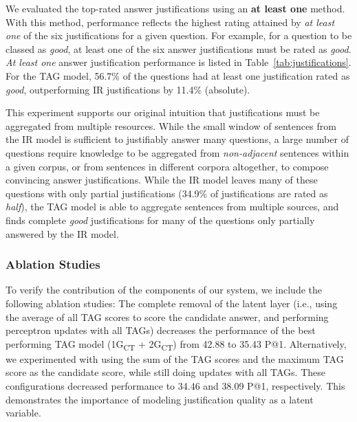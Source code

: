 {We evaluated the top-rated answer justifications using an {\bf at least one} method.  With this method, performance reflects the highest rating attained by \emph{at least one} of the six justifications for a given question. For example, for a question to be classed as {\em good}, at least one of the six answer justifications must be rated as {\em good}.  \emph{At least one} answer justification performance is listed in Table~\ref{tab:justifications}. For the TAG model, 56.7\% of the questions had at least one justification rated as {\em good}, outperforming IR justifications by 11.4\% (absolute).  


This experiment supports our original intuition that justifications must be aggregated from multiple resources. While the small window of sentences from the IR model is sufficient to justifiably answer many questions, a large number of questions require knowledge to be aggregated from {\em non-adjacent} sentences within a given corpus, or from sentences in different corpora altogether, to compose convincing answer justifications.  While the IR model leaves many of these questions with only partial justifications (34.9\% of justifications are rated as {\em half}), the TAG model  is able to aggregate sentences from multiple sources, and finds complete {\em good} justifications for many of the questions only partially answered by the IR model.


\subsubsection{Ablation Studies}
\label{sec-cl2017:controls}
To verify the contribution of the components of our system, we include the following ablation studies:
{} The complete removal of the latent layer (i.e., using the average of all TAG scores to score the candidate answer, and performing perceptron updates with all TAGs) decreases the performance of the best performing TAG model (1G\textsubscript{CT} + 2G\textsubscript{CT}) from 42.88 to 35.43 P@1.  Alternatively, we experimented with using the sum of the TAG scores and the maximum TAG score as the candidate score, while still doing updates with all TAGs.  These configurations decreased performance to 34.46 and 38.09 P@1, respectively. This demonstrates the importance of modeling justification quality as a latent variable.

}
